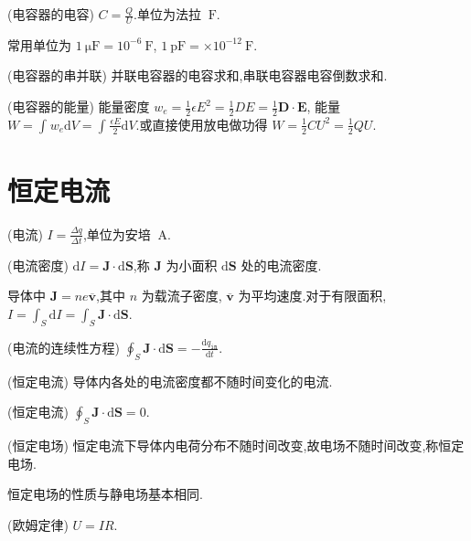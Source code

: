     \begin{definition}
        (电容器的电容) $C=\frac{Q}{U}$.单位为法拉 $\ \mathrm{F}$.
    \end{definition}
    常用单位为 $1 \ \mathrm{\mu F}=10^{-6} \ \mathrm{F}$, $1 \ \mathrm{p F}=\times 10^{-12} \ \mathrm{F}$.
    \begin{theorem}
        (电容器的串并联) 并联电容器的电容求和,串联电容器电容倒数求和.
    \end{theorem}
    \begin{definition}
        (电容器的能量) 能量密度 $w_{e}=\frac{1}{2}\epsilon E^2=\frac{1}{2}DE=\frac{1}{2}\bm{D}\cdot \bm{E}$, 能量 $W=\int_{}^{}w_{e}\mathrm{d}V=\int_{}^{}\frac{\epsilon E}{2}\mathrm{d}V$.或直接使用放电做功得 $W=\frac{1}{2}CU^2=\frac{1}{2}QU$.
    \end{definition}
    \section{恒定电流}
    \begin{definition}
        (电流) $I=\frac{\Delta q}{\Delta t}$,单位为安培 $\ \mathrm{A}$.
    \end{definition}
    \begin{definition}
        (电流密度) $\mathrm{d}I=\bm{J}\cdot \mathrm{d}\bm{S}$,称 $\bm{J}$ 为小面积 $\mathrm{d}\bm{S}$ 处的电流密度.
    \end{definition}
    导体中 $\bm{J}=ne \overline{\bm{v}}$,其中 $n$ 为载流子密度, $\overline{\bm{v}}$ 为平均速度.对于有限面积, $I=\int_{S}^{}\mathrm{d}I=\int_{S}^{}\bm{J}\cdot \mathrm{d}\bm{S}$.
    \begin{theorem}
        (电流的连续性方程) $\oint_{S}^{}\bm{J}\cdot \mathrm{d}\bm{S}=-\frac{\mathrm{d}q_{\texttt{in}}}{\mathrm{d}t}$.
    \end{theorem}
    \begin{definition}
        (恒定电流) 导体内各处的电流密度都不随时间变化的电流.
    \end{definition}
    \begin{theorem}
        (恒定电流) $\oint_{S}^{}\bm{J}\cdot \mathrm{d}\bm{S}=0$.
    \end{theorem}
    \begin{theorem}
        (恒定电场) 恒定电流下导体内电荷分布不随时间改变,故电场不随时间改变,称恒定电场.
    \end{theorem}
    恒定电场的性质与静电场基本相同.
    \begin{theorem}
        (欧姆定律) $U=IR$.
    \end{theorem}
